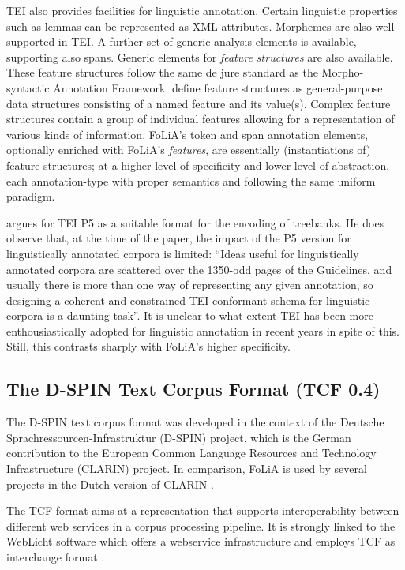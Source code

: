 \documentclass[a4paper,10pt,twoside]{article}
\begin{document}
TEI also provides facilities for linguistic annotation. Certain
linguistic properties such as lemmas can be represented as XML attributes.
Morphemes are also well supported in TEI. A further set of generic analysis
elements is available, supporting also spans. Generic elements for
\emph{feature structures} are also available. These feature structures follow
the same de jure standard as the Morpho-syntactic Annotation Framework.  define
feature structures as general-purpose data structures consisting of a named
feature and its value(s). Complex feature structures contain a group of
individual features allowing for a representation of various kinds of
information. FoLiA's token and span annotation elements, optionally enriched
with FoLiA's \emph{features}, are essentially (instantiations of) feature structures;
at a higher level of specificity and lower level of abstraction, each
annotation-type with proper semantics and following the same uniform paradigm.

 argues for TEI P5 as a suitable format for the encoding of
treebanks. He does observe that, at the time of the paper, the impact of the P5
version for linguistically annotated corpora is limited: ``Ideas useful for
linguistically annotated corpora are scattered over the 1350-odd pages of the
Guidelines, and usually there is more than one way of representing any given
annotation, so designing a coherent and constrained TEI-conformant schema for
linguistic corpora is a daunting task''.  It is unclear to what extent TEI has
been more enthousiastically adopted for linguistic annotation in recent years
in spite of this. Still, this contrasts sharply with FoLiA's higher
specificity.


\subsection{The D-SPIN Text Corpus Format (TCF 0.4)}

The D-SPIN text corpus format \cite{TCF} was developed in the context of the
Deutsche Sprachressourcen-Infrastruktur (D-SPIN) project, which is the
German contribution to the European Common Language Resources and Technology
Infrastructure (CLARIN) project. In comparison, FoLiA is used by several
projects in the Dutch version of CLARIN \cite{CLARINNL}.

The TCF format aims at a representation that supports interoperability between
different web services in a corpus processing pipeline. It is strongly linked to
the WebLicht software which offers a webservice infrastructure and employs
TCF as interchange format \cite{WEBLICHT}.
\end{document}
